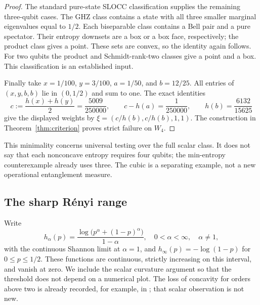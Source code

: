 \documentclass[11pt,a4paper]{article}
\begin{document}
\begin{proof}
The standard pure-state SLOCC classification \cite{DVC} supplies the
remaining three-qubit cases. The GHZ class contains a state with all
three smaller marginal eigenvalues equal to \(1/2\). Each biseparable
class contains a Bell pair and a pure spectator. Their entropy
downsets are a box or a box face, respectively; the product class
gives a point. These sets are convex, so the identity again follows.
For two qubits the product and Schmidt-rank-two classes give a point
and a box. This classification is an established input.

Finally take \(x=1/100\), \(y=3/100\), \(a=1/50\), and
\(b=12/25\). All entries of \((x,y,b,b)\) lie in \((0,1/2)\)
and sum to one. The exact identities
\[
 c:=\frac{h(x)+h(y)}2=\frac{5009}{250000},\qquad
 c-h(a)=\frac1{250000},\qquad h(b)=\frac{6132}{15625}
\]
give the displayed weights by \(\xi=(c/h(b),c/h(b),1,1)\).
The construction in Theorem~\ref{thm:criterion} proves strict failure
on \(W_4\).
\end{proof}

This minimality concerns universal testing over the full scalar class.
It does not say that each nonconcave entropy requires four qubits;
the min-entropy counterexample already uses three. The cubic is a
separating example, not a new operational entanglement measure.

\subsection{The sharp R\'enyi range}
Write
\[
 h_\alpha(p)=\frac{\log\bigl(p^\alpha+(1-p)^\alpha\bigr)}{1-\alpha},
 \quad 0<\alpha<\infty,\quad\alpha\ne1,
\]
with the continuous Shannon limit at \(\alpha=1\), and
\(h_\infty(p)=-\log(1-p)\) for \(0\le p\le1/2\).
These functions are continuous, strictly increasing on this interval,
and vanish at zero. We include the scalar curvature argument so that
the threshold does not depend on a numerical plot. The loss of
concavity for orders above two is already recorded, for example,
in \cite[Lemma 4.3]{Hillion}; that scalar observation is not new.
\end{document}
